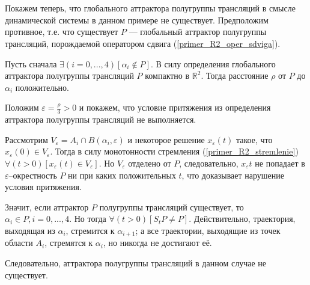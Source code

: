 \section{}

Покажем теперь, что глобального аттрактора полугруппы трансляций
в смысле динамической системы в данном примере не существует.
Предположим противное, т.е. что существует $P$ --- глобальный аттрактор полугруппы трансляций,
порождаемой оператором сдвига (\ref{primer_R2_oper_sdviga}).

Пусть сначала $\exists(i=0,...,4)[\alpha_i \notin P]$.
В силу определения глобального аттрактора полугруппы трансляций
$P$ компактно в $\mathbb{R}^2$.
Тогда расстояние $\rho$ от $P$ до $\alpha_i$ положительно.

Положим $\varepsilon = \frac{\rho}{3} > 0$ и покажем,
что условие притяжения из определения аттрактора полугруппы трансляций не выполняется.

Рассмотрим $V_\varepsilon = A_i \cap B(\alpha_i, \varepsilon)$ и некоторое решение $x_\varepsilon(t)$
такое, что $x_\varepsilon(0) \in V_\varepsilon$.
Тогда в силу монотонности стремления (\ref{primer_R2_stremlenie})
$\forall(t>0)[x_\varepsilon(t) \in V_\varepsilon]$.
Но $V_\varepsilon$ отделено от $P$, следовательно, $x_\varepsilon{t}$ не попадает в $\varepsilon$--окрестность $P$
ни при каких положительных $t$, что доказывает нарушение условия притяжения.

Значит, если аттрактор $P$ полугруппы трансляций существует, то $\alpha_i \in P, i=0,...,4$.
Но тогда $\forall(t>0)[S_t P \ne P]$.
Действительно, траектория, выходящая из $\alpha_i$, стремится к $\alpha_{i+1}$;
а все траектории, выходящие из точек области $A_i$, стремятся к $\alpha_i$,
но никогда не достигают её.

Следовательно, аттрактора полугруппы трансляций в данном случае не существует.
